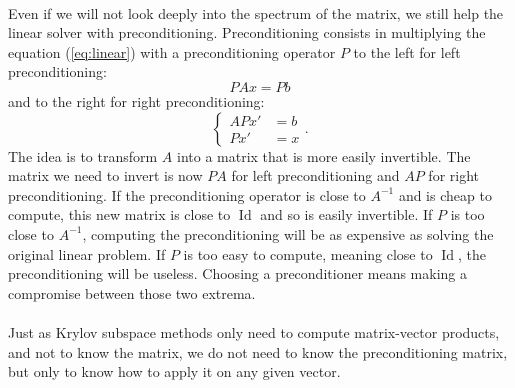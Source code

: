       \paragraph{}
      Even if we will not look deeply into the spectrum of the matrix, we still help the linear solver with preconditioning.
      Preconditioning consists in multiplying the equation (\ref{eq:linear}) with a preconditioning operator $P$ to the left for left preconditioning:
      \begin{equation}
        PAx = Pb
      \end{equation}
      and to the right for right preconditioning:
      \begin{equation}
        \left\{\begin{aligned} APx' &= b \\	Px' &= x \end{aligned}\right. .
      \end{equation}
      The idea is to transform $A$ into a matrix that is more easily invertible.
      The matrix we need to invert is now $PA$ for left preconditioning and $AP$ for right preconditioning.
      If the preconditioning operator is close to $A^{-1}$ and is cheap to compute, this new matrix is close to $\operatorname{Id}$ and so is easily invertible.
      If $P$ is too close to $A^{-1}$, computing the preconditioning will be as expensive as solving the original linear problem.
      If $P$ is too easy to compute, meaning close to $\operatorname{Id}$, the preconditioning will be useless.
      Choosing a preconditioner means making a compromise between those two extrema.

      \paragraph{}
      Just as Krylov subspace methods only need to compute matrix-vector products, and not to know the matrix, we do not need to know the preconditioning matrix, but only to know how to apply it on any given vector.

